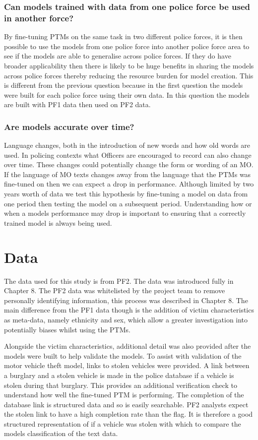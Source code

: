 \subsubsection{Can models trained with data from one police force be used in another force?} By fine-tuning PTMs on the same task in two different police forces, it is then possible to use the models from one police force into another police force area to see if the models are able to generalise across police forces. If they do have broader applicability then there is likely to be huge benefits in sharing the models across police forces thereby reducing the resource burden for model creation. This is different from the previous question because in the first question the models were built for each police force using their own data. In this question the models are built with PF1 data then used on PF2 data.

\subsubsection{Are models accurate over time?} Language changes, both in the introduction of new words and how old words are used. In policing contexts what Officers are encouraged to record can also change over time. These changes could potentially change the form or wording of an MO.  If the language of MO texts changes away from the language that the PTMs was fine-tuned on then we can expect a drop in performance. Although limited by two years worth of data we test this hypothesis by fine-tuning a model on data from one period then testing the model on a subsequent period. Understanding how or when a models performance may drop is important to ensuring that a correctly trained model is always being used.

\section{Data} The data used for this study is from PF2. The data was introduced fully in Chapter 8. The PF2 data was whitelisted by the project team to remove personally identifying information, this process was described in Chapter 8. The main difference from the PF1 data though is the addition of victim characteristics as meta-data, namely ethnicity and sex, which allow a greater investigation into potentially biases whilst using the PTMs. 

Alongside the victim characteristics, additional detail was also provided after the models were built to help validate the models. To assist with validation of the motor vehicle theft model, links to stolen vehicles were provided. A link between a burglary and a stolen vehicle is made in the police database if a vehicle is stolen during that burglary. This provides an additional verification check to understand how well the fine-tuned PTM is performing. The completion of the database link is  structured data and so is easily searchable. PF2 analysts expect the stolen link to have a high completion rate than the flag. It is therefore a good structured representation of if a vehicle was stolen with which to compare the models classification of the text data.


